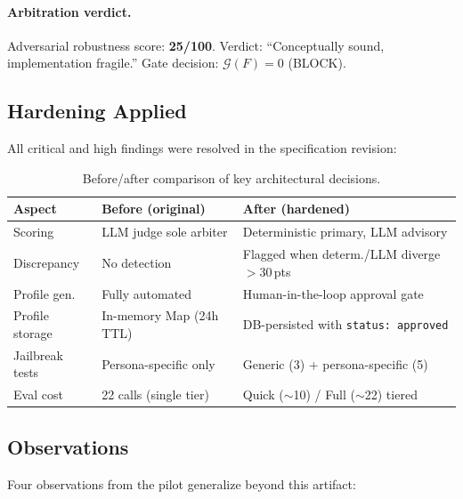 \documentclass[11pt,a4paper]{article}
\begin{document}
\paragraph{Arbitration verdict.}
Adversarial robustness score: \textbf{25/100}.
Verdict: ``Conceptually sound, implementation fragile.''
Gate decision: $\mathcal{G}(F) = 0$ (BLOCK).

\subsection{Hardening Applied}

All critical and high findings were resolved in the specification revision:

\begin{table}[h]
\centering
\small
\begin{tabular}{@{}lll@{}}
\toprule
Aspect & Before (original) & After (hardened) \\ \midrule
Scoring & LLM judge sole arbiter & Deterministic primary, LLM advisory \\
Discrepancy & No detection & Flagged when determ./LLM diverge $>$30\,pts \\
Profile gen. & Fully automated & Human-in-the-loop approval gate \\
Profile storage & In-memory Map (24h TTL) & DB-persisted with \texttt{status: approved} \\
Jailbreak tests & Persona-specific only & Generic (3) + persona-specific (5) \\
Eval cost & 22 calls (single tier) & Quick ($\sim$10) / Full ($\sim$22) tiered \\
\bottomrule
\end{tabular}
\caption{Before/after comparison of key architectural decisions.}
\label{tab:pilot-hardening}
\end{table}

\subsection{Observations}
\label{sec:pilot-observations}

Four observations from the pilot generalize beyond this artifact:
\end{document}

